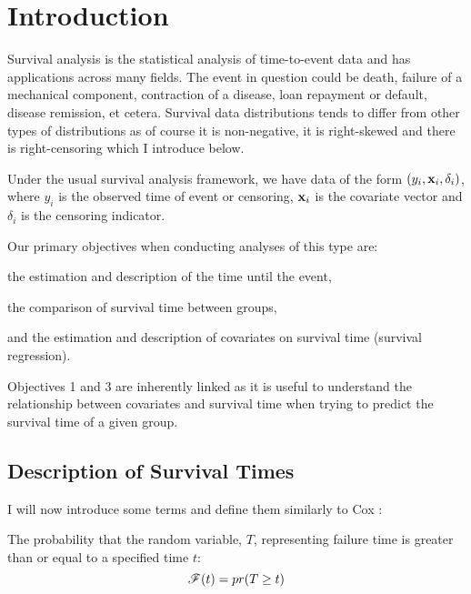 \section{Introduction}

Survival analysis is the statistical analysis of time-to-event data and has applications across many fields. The event in question could be death, failure of a mechanical component, contraction of a disease, loan repayment or default, disease remission, et cetera. Survival data distributions tends to differ from other types of distributions as of course it is non-negative, it is right-skewed and there is right-censoring which I introduce below.

Under the usual survival analysis framework, we have data of the form $(y_i, \textbf{x}_i, \delta_i)$, where $y_i$ is the observed time of event or censoring, $\textbf{x}_i$ is the covariate vector and $\delta_i$ is the censoring indicator.

Our primary objectives when conducting analyses of this type are:
\begin{enumerate}
\begin{spacing}{0}
    \item the estimation and description of the time until the event,
    \item the comparison of survival time between groups,
    \item and the estimation and description of covariates on survival time (survival regression).
\end{spacing}
\end{enumerate}
Objectives 1 and 3 are inherently linked as it is useful to understand the relationship between covariates and survival time when trying to predict the survival time of a given group.

\subsection{Description of Survival Times}

I will now introduce some terms and define them similarly to Cox :

\begin{definition}\label{survivor-function}
The probability that the random variable, $T$, representing failure time is greater than or equal to a specified time $t$:
\begin{equation}
    \mathscr{F}(t)=pr(T\geq t)
\end{equation}
\end{definition}

